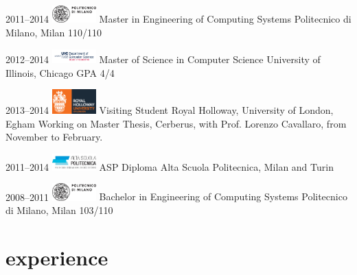 \documentclass[]{friggeri-cv} %
\newcommand{\breath}{\newline\vspace*{-.35cm}\newline}
\begin{document}
\begin{entrylist}
\entry
{2011--2014\breath
\includegraphics[width=1.7cm]{img/logo_polimi.eps}}
{Master {\normalfont in Engineering of Computing Systems}}
{Politecnico di Milano, Milan}
{110/110}
\rule{0pt}{3ex}
\entry
{2012--2014\breath
\includegraphics[width=1.7cm]{img/logo_uic.pdf}}
{Master of Science {\normalfont in Computer Science}}
{University of Illinois, Chicago}
{GPA 4/4}
\rule{0pt}{3ex}
\entry
{2013--2014\breath
\includegraphics[width=1.7cm]{img/logo_rhul.eps}}
{Visiting Student}
{Royal Holloway, University of London, Egham}
{Working on Master Thesis, Cerberus, with Prof. Lorenzo Cavallaro, from November to February.}
\rule{0pt}{3ex}
\entry
{2011--2014\breath
\includegraphics[width=1.7cm]{img/logo_asp.jpg}}
{ASP Diploma}
{Alta Scuola Politecnica, Milan and Turin}
{}
\rule{0pt}{3ex}
\entry
{2008--2011\breath
\includegraphics[width=1.7cm]{img/logo_polimi.eps}}
{Bachelor {\normalfont in Engineering of Computing Systems}}
{Politecnico di Milano, Milan}
{103/110}
\end{entrylist}


\section{experience}
\end{document}
